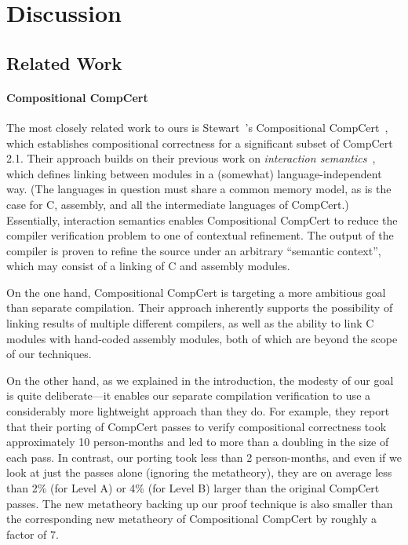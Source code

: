 \section{Discussion}
\label{sec:sepcomp:discussion}





\subsection{Related Work}

\paragraph{Compositional CompCert}

The most closely related work to ours is Stewart~\etal's Compositional
CompCert~\cite{stewart+:popl2015}, which establishes compositional correctness for a
significant subset of CompCert 2.1.  Their approach builds on their
previous work on \emph{interaction semantics}~\cite{beringer+:esop14}, which defines
linking between modules in a (somewhat) language-independent way.
(The languages in question must share a common memory model, as is the
case for C, assembly, and all the intermediate languages of CompCert.)
Essentially, interaction semantics enables Compositional CompCert to
reduce the compiler verification problem to one of contextual
refinement.  The output of the compiler is proven to refine the source
under an arbitrary ``semantic context'', which may consist of a
linking of C and assembly modules.

On the one hand, Compositional CompCert is targeting a more ambitious
goal than separate compilation.  Their approach inherently supports the
possibility of linking results of multiple different compilers, as
well as the ability to link C modules with hand-coded assembly
modules, both of which are beyond the scope of our techniques.

On the other hand, as we explained in the introduction, the modesty of
our goal is quite deliberate---it enables our separate compilation verification
to use a considerably more lightweight approach than they do.  For
example, they report that their porting of CompCert passes to verify
compositional correctness took approximately 10 person-months and led
to more than a doubling in the size of each pass.  In contrast, our
porting took less than 2 person-months, and even if we look at just
the passes alone (ignoring the metatheory), they are on average less
than 2\% (for Level A) or 4\% (for Level B) larger than the original
CompCert passes.  The new metatheory backing up our proof technique is
also smaller than the corresponding new metatheory of Compositional
CompCert by roughly a factor of 7.

